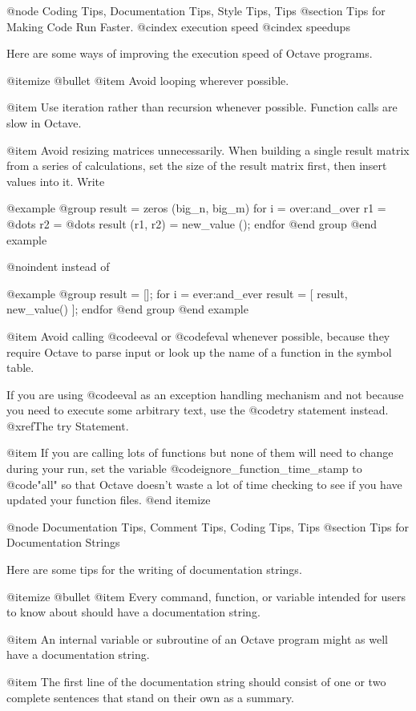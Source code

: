 @node Coding Tips, Documentation Tips, Style Tips, Tips
@section Tips for Making Code Run Faster.
@cindex execution speed
@cindex speedups

Here are some ways of improving the execution speed of Octave programs.

@itemize @bullet
@item
Avoid looping wherever possible.

@item
Use iteration rather than recursion whenever possible.
Function calls are slow in Octave.

@item
Avoid resizing matrices unnecessarily.  When building a single result
matrix from a series of calculations, set the size of the result matrix
first, then insert values into it.  Write

@example
@group
result = zeros (big_n, big_m)
for i = over:and_over
  r1 = @dots{}
  r2 = @dots{}
  result (r1, r2) = new_value ();
endfor
@end group
@end example

@noindent
instead of

@example
@group
result = [];
for i = ever:and_ever
  result = [ result, new_value() ];
endfor
@end group
@end example

@item
Avoid calling @code{eval} or @code{feval} whenever possible, because
they require Octave to parse input or look up the name of a function in
the symbol table.

If you are using @code{eval} as an exception handling mechanism and not
because you need to execute some arbitrary text, use the @code{try}
statement instead.  @xref{The try Statement}.

@item
If you are calling lots of functions but none of them will need to
change during your run, set the variable
@code{ignore_function_time_stamp} to @code{"all"} so that Octave doesn't
waste a lot of time checking to see if you have updated your function
files.
@end itemize

@node Documentation Tips, Comment Tips, Coding Tips, Tips
@section Tips for Documentation Strings

Here are some tips for the writing of documentation strings.

@itemize @bullet
@item
Every command, function, or variable intended for users to know about
should have a documentation string.

@item
An internal variable or subroutine of an Octave program might as well have
a documentation string.

@item
The first line of the documentation string should consist of one or two
complete sentences that stand on their own as a summary.


